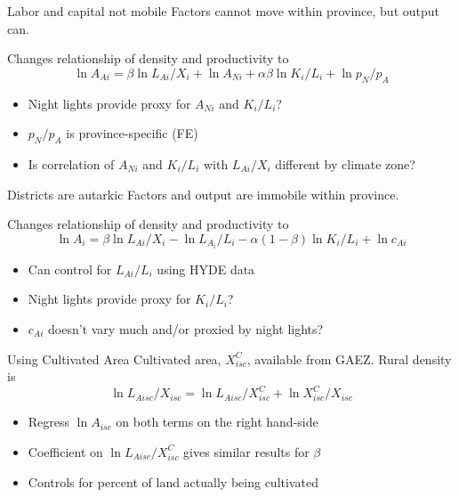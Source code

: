 \documentclass[10pt, xcolor=dvipsnames]{beamer}
\begin{document}
\begin{frame}{Labor and capital not mobile}\label{nonmobile}
Factors cannot move within province, but output can.

\vspace{.2cm} Changes relationship of density and productivity to
\begin{equation}
  \ln A_{Ai} = \beta \ln L_{Ai}/X_i + \ln A_{Ni} + \alpha\beta \ln K_i/L_i + \ln p_N/p_A \nonumber
\end{equation}
\begin{itemize}
  \item Night lights provide proxy for $A_{Ni}$ and $K_i/L_i$?
  \item $p_N/p_A$ is province-specific (FE)
  \item Is correlation of $A_{Ni}$ and $K_i/L_i$ with $L_{Ai}/X_i$ different by climate zone?
\end{itemize}

\hfill \hyperlink{robustness}{}
\end{frame}

\begin{frame}{Districts are autarkic}\label{autarky}
Factors and output are immobile within province.

\vspace{.2cm} Changes relationship of density and productivity to
\begin{equation}
\ln A_i = \beta \ln L_{Ai}/X_i - \ln L_{A_i}/L_i - \alpha(1-\beta) \ln K_{i}/L_{i} + \ln c_{Ai} \nonumber
\end{equation}
\begin{itemize}
  \item Can control for $L_{Ai}/L_i$ using HYDE data
  \item Night lights provide proxy for $K_i/L_i$?
  \item $c_{Ai}$ doesn't vary much and/or proxied by night lights?
\end{itemize}

\hfill \hyperlink{robustness}{}
\end{frame}


\begin{frame}{Using Cultivated Area}\label{cultivated}
Cultivated area, $X^C_{isc}$, available from GAEZ. Rural density is
\begin{equation}
  \ln L_{Aisc}/X_{isc} = \ln L_{Aisc}/X^C_{isc} + \ln X^C_{isc}/X_{isc}
\end{equation}

\begin{itemize}
  \item Regress $\ln A_{isc}$ on both terms on the right hand-side 
  \item Coefficient on $\ln L_{Aisc}/X^C_{isc}$ gives similar results for $\beta$
  \item Controls for percent of land actually being cultivated
\end{itemize}

\hfill \hyperlink{land}{}
\end{frame}
\end{document}
